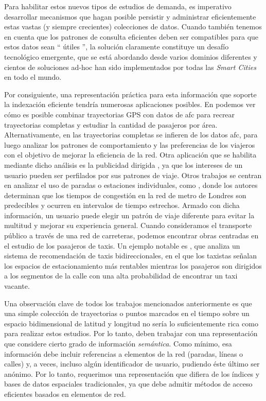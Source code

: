     Para habilitar estos nuevos tipos de estudios de demanda, es imperativo desarrollar mecanismos que hagan posible persistir y administrar eficientemente estas vastas (y siempre crecientes) colecciones de datos. Cuando tambi\'en tenemos en cuenta que los patrones de consulta eficientes deben ser compatibles para que estos datos sean `` \'utiles '', la soluci\'on claramente constituye un desaf\'io tecnol\'ogico emergente, que se est\'a abordando desde varios dominios diferentes y cientos de soluciones ad-hoc han sido implementados por todas las \textit{Smart Cities} en todo el mundo.
    
    Por consiguiente, una representaci\'on pr\'actica para esta informaci\'on que soporte la indexaci\'on eficiente tendr\'ia numerosas aplicaciones posibles. En \cite{tu2018spatial} podemos ver c\'omo es posible combinar trayectorias GPS con datos de \gls{afc} para recrear trayectorias completas y estudiar la cantidad de pasajeros por \'area. Alternativamente, en \cite{weng2018mining} las trayectorias completas se infieren de los datos \gls{afc}, para luego analizar los patrones de comportamiento y las preferencias de los viajeros con el objetivo de mejorar la eficiencia de la red. Otra aplicaci\'on que se habilita mediante dicho an\'alisis es la publicidad dirigida \cite{zhang2017targeted}, ya que los intereses de un usuario pueden ser perfilados por sus patrones de viaje. Otros trabajos se centran en analizar el uso de paradas o estaciones individuales, como \cite{ceapa2012avoiding}, donde los autores determinan que los tiempos de congesti\'on en la red de metro de Londres son predecibles y ocurren en intervalos de tiempo estrechos. Armado con dicha informaci\'on, un usuario puede elegir un patr\'on de viaje diferente para evitar la multitud y mejorar su experiencia general. Cuando consideramos el transporte p\'ublico a trav\'es de una red de carreteras, podemos encontrar obras centradas en el estudio de los pasajeros de taxis. Un ejemplo notable es \cite{yuan2013t}, que analiza un sistema de recomendaci\'on de taxis bidireccionales, en el que los taxistas se\~nalan los espacios de estacionamiento m\'as rentables mientras los pasajeros son dirigidos a los segmentos de la calle con una alta probabilidad de encontrar un taxi vacante.
    
    Una observaci\'on clave de todos los trabajos mencionados anteriormente es que una simple colecci\'on de trayectorias o puntos marcados en el tiempo sobre un espacio bidimensional de latitud y longitud no ser\'ia lo suficientemente rica como para realizar estos estudios. Por lo tanto, deben trabajar con una representaci\'on que considere cierto grado de informaci\'on \textit{sem\'antica}. Como m\'inimo, esa informaci\'on debe incluir referencias a elementos de la red (paradas, l\'ineas o calles) y, a veces, incluso alg\'un identificador de usuario, pudiendo \'este \'ultimo ser an\'onimo. Por lo tanto, requerimos una representaci\'on que difiera de los \'indices y bases de datos espaciales tradicionales, ya que debe admitir m\'etodos de acceso eficientes basados en elementos de red.


